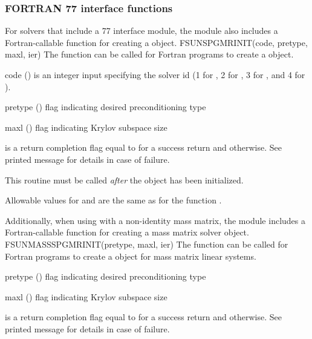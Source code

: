 \subsubsection*{FORTRAN 77 interface functions}
For solvers that include a {\F} 77 interface module, the
{\sunlinsolspgmr} module also includes a Fortran-callable function
for creating a  object.
%
%
{
  FSUNSPGMRINIT(code, pretype, maxl, ier)
}
{
  The function  can be called for Fortran programs
  to create a {\sunlinsolspgmr} object.
}
{
  \begin{args}[pretype]
  \item[code] ()
    is an integer input specifying the solver id (1 for {\cvode}, 2
    for {\ida}, 3 for {\kinsol}, and 4 for {\arkode}).
  \item[pretype] ()
    flag indicating desired preconditioning type
  \item[maxl] ()
    flag indicating Krylov subspace size
  \end{args}
}
{
   is a return completion flag equal to  for a success
  return and  otherwise. See printed message for details in case
  of failure.
}
{
  This routine must be called \emph{after} the {\nvector} object has
  been initialized.

  Allowable values for  and  are the same as for
  the {\CC} function \newline {}.
}
Additionally, when using {\arkode} with a non-identity
mass matrix, the {\sunlinsolspgmr} module includes a Fortran-callable
function for creating a  mass matrix solver
object.
%
%
{
  FSUNMASSSPGMRINIT(pretype, maxl, ier)
}
{
  The function  can be called for Fortran programs
  to create a {\sunlinsolspgmr} object for mass matrix linear systems.
}
{
  \begin{args}[pretype]
  \item[pretype] ()
    flag indicating desired preconditioning type
  \item[maxl] ()
    flag indicating Krylov subspace size
  \end{args}
}
{
   is a  return completion flag equal to  for a success
  return and  otherwise. See printed message for details in case
  of failure.
}
